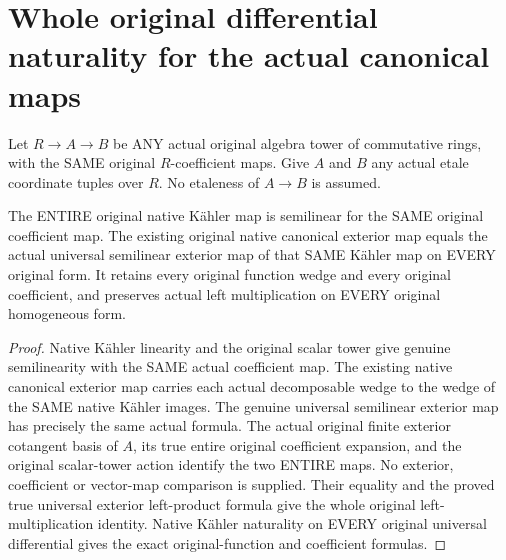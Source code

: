 \section{Whole original differential naturality for the actual canonical maps}
\label{sec:etale-differential-naturality}

Let $R\to A\to B$ be ANY actual original algebra tower of commutative rings,
with the SAME original $R$-coefficient maps. Give $A$ and $B$ any actual
etale coordinate tuples over $R$. No etaleness of $A\to B$ is assumed.

\begin{theorem}
\label{lem:cartier-native-canonical-exterior-map-comparison}
\leanok
The ENTIRE original native K\"ahler map is semilinear for the SAME original
coefficient map. The existing original native canonical exterior map equals
the actual universal semilinear exterior map of that SAME K\"ahler map on
EVERY original form. It retains every original function wedge and every
original coefficient, and preserves actual left multiplication on EVERY
original homogeneous form.
\end{theorem}
\begin{proof}
Native K\"ahler linearity and the original scalar tower give genuine
semilinearity with the SAME actual coefficient map. The existing native
canonical exterior map carries each actual decomposable wedge to the wedge
of the SAME native K\"ahler images. The genuine universal semilinear exterior
map has precisely the same actual formula. The actual original finite
exterior cotangent basis of $A$, its true entire original coefficient
expansion, and the original scalar-tower action identify the two ENTIRE
maps. No exterior, coefficient or vector-map comparison is supplied.
Their equality and the proved true universal exterior left-product formula
give the whole original left-multiplication identity. Native K\"ahler
naturality on EVERY original universal differential gives the exact
original-function and coefficient formulas.
\end{proof}

